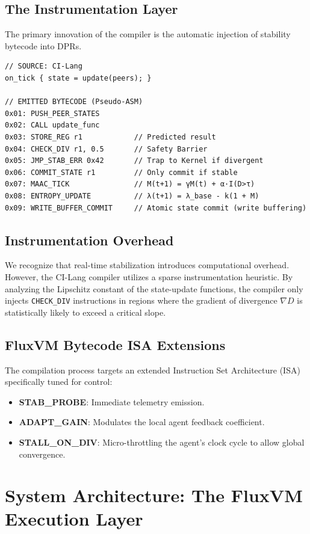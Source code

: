 \documentclass{article}
\begin{document}
\subsection{The Instrumentation Layer}
The primary innovation of the compiler is the automatic injection of stability bytecode into DPRs. 
\begin{verbatim}
// SOURCE: CI-Lang
on_tick { state = update(peers); }

// EMITTED BYTECODE (Pseudo-ASM)
0x01: PUSH_PEER_STATES
0x02: CALL update_func
0x03: STORE_REG r1            // Predicted result
0x04: CHECK_DIV r1, 0.5       // Safety Barrier
0x05: JMP_STAB_ERR 0x42       // Trap to Kernel if divergent
0x06: COMMIT_STATE r1         // Only commit if stable
0x07: MAAC_TICK               // M(t+1) = γM(t) + α·I(D>τ)
0x08: ENTROPY_UPDATE          // λ(t+1) = λ_base - k(1 + M)
0x09: WRITE_BUFFER_COMMIT     // Atomic state commit (write buffering)
\end{verbatim}

\subsection{Instrumentation Overhead}
We recognize that real-time stabilization introduces computational overhead. However, the CI-Lang compiler utilizes a sparse instrumentation heuristic. By analyzing the Lipschitz constant of the state-update functions, the compiler only injects \texttt{CHECK\_DIV} instructions in regions where the gradient of divergence $\nabla D$ is statistically likely to exceed a critical slope.

\subsection{FluxVM Bytecode ISA Extensions}
The compilation process targets an extended Instruction Set Architecture (ISA) specifically tuned for control:
\begin{itemize}
    \item \textbf{STAB\_PROBE}: Immediate telemetry emission.
    \item \textbf{ADAPT\_GAIN}: Modulates the local agent feedback coefficient.
    \item \textbf{STALL\_ON\_DIV}: Micro-throttling the agent's clock cycle to allow global convergence.
\end{itemize}

\newpage

\section{System Architecture: The FluxVM Execution Layer}
\label{sec:system_architecture}
\end{document}
